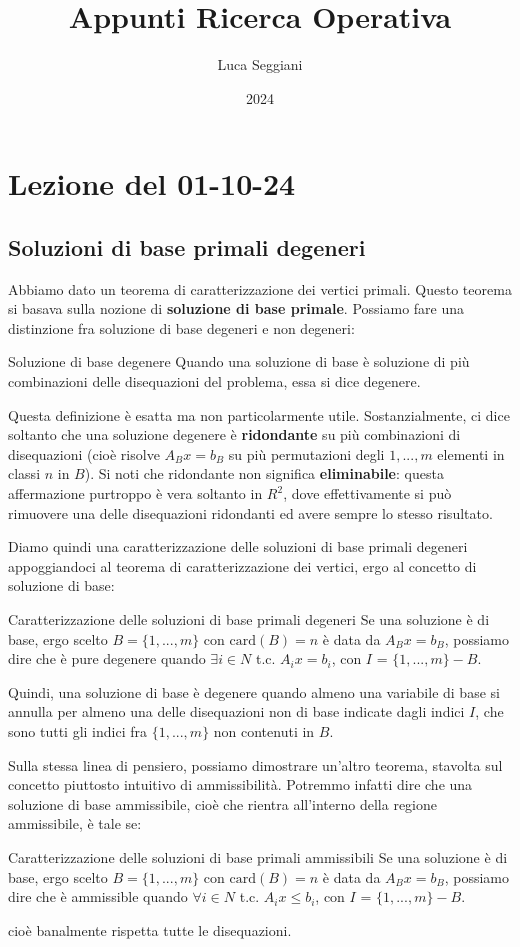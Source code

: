 \documentclass[a4paper,11pt]{article}
\title{Appunti Ricerca Operativa}
\author{Luca Seggiani}
\date{2024}
\begin{document}
\section{Lezione del 01-10-24}

\thispagestyle{empty}
\pagestyle{fancy}

\subsection{Soluzioni di base primali degeneri}
Abbiamo dato un teorema di caratterizzazione dei vertici primali.
Questo teorema si basava sulla nozione di \textbf{soluzione di base primale}.
Possiamo fare una distinzione fra soluzione di base degeneri e non degeneri:
\begin{definition}{Soluzione di base degenere}
Quando una soluzione di base è soluzione di più combinazioni delle disequazioni del problema, essa si dice degenere.
\end{definition}

Questa definizione è esatta ma non particolarmente utile.
Sostanzialmente, ci dice soltanto che una soluzione degenere è \textbf{ridondante} su più combinazioni di disequazioni (cioè risolve $A_Bx = b_B$ su più permutazioni degli $1,...,m$ elementi in classi $n$ in $B$).
Si noti che ridondante non significa \textbf{eliminabile}: questa affermazione purtroppo è vera soltanto in $R^2$, dove effettivamente si può rimuovere una delle disequazioni ridondanti ed avere sempre lo stesso risultato.

Diamo quindi una caratterizzazione delle soluzioni di base primali degeneri appoggiandoci al teorema di caratterizzazione dei vertici, ergo al concetto di soluzione di base:
\begin{theorem}{Caratterizzazione delle soluzioni di base primali degeneri}
	Se una soluzione è di base, ergo scelto $B = \{ 1, ..., m \}$ con $\mathrm{card}(B) = n$ è data da $A_Bx = b_B$, possiamo dire che è pure degenere quando $\exists i \in N$ t.c. $A_i x = b_i$, con $I$ = $\{1, ..., m\} - B$. 
\end{theorem}
Quindi, una soluzione di base è degenere quando almeno una variabile di base si annulla per almeno una delle disequazioni non di base indicate dagli indici $I$, che sono tutti gli indici fra $\{1,...,m\}$ non contenuti in $B$. 

Sulla stessa linea di pensiero, possiamo dimostrare un'altro teorema, stavolta sul concetto piuttosto intuitivo di ammissibilità.
Potremmo infatti dire che una soluzione di base ammissibile, cioè che rientra all'interno della regione ammissibile, è tale se:
\begin{theorem}{Caratterizzazione delle soluzioni di base primali ammissibili}
	Se una soluzione è di base, ergo scelto $B = \{ 1, ..., m \}$ con $\mathrm{card}(B) = n$ è data da $A_Bx = b_B$, possiamo dire che è ammissible quando $\forall i \in N$ t.c. $A_i x \leq b_i$, con $I$ = $\{1, ..., m\} - B$. 
\end{theorem}
cioè banalmente rispetta tutte le disequazioni.
\end{document}
